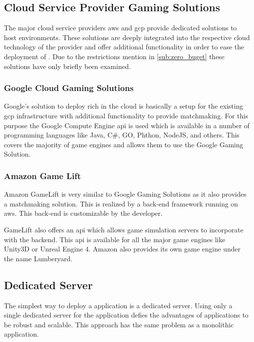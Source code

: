 \subsection{Cloud Service Provider Gaming Solutions}

The major cloud service providers \gls{aws} and
\gls{gcp} provide dedicated solutions to host \og{} environments.
These solutions are deeply integrated into the respective cloud technology of
the provider and offer additional functionality in order to ease the deployment
of \ogs{}. Due to the restrictions mention in \autoref{sub:zero_buget} these
solutions have only briefly been examined.

\subsubsection{Google Cloud Gaming Solutions}

Google's solution to deploy rich \ogs{} in the cloud is basically a setup
for the existing \gls{gcp} infrastructure with additional functionality to
provide matchmaking. For this purpose the Google Compute Engine \gls{api} is used
which is available in a number of programming languages like Java, C\#, GO,
Phthon, NodeJS, and others. This covers the majority of game engines and
allows them to use the Google Gaming Solution.

\subsubsection{Amazon Game Lift}

Amazon GameLift is very similar to Google Gaming Solutions as it also provides
a matchmaking solution. This is realized by a back-end framework running on
\gls{aws}. This back-end is customizable by the developer.

GameLift also offers an \gls{api} which allows game simulation servers to
incorporate with the backend. This \gls{api} is available for all the major game
engines like Unity3D or Unreal Engine 4. Amazon also provides its own game
engine under the name Lumberyard.

\subsection{Dedicated Server}

The simplest way to deploy a \ms{} application is a dedicated server. Using only
a single dedicated server for the application defies the advantages of \ms{}
applications to be robust and scalable. This approach has the same problem as a
monolithic application.

